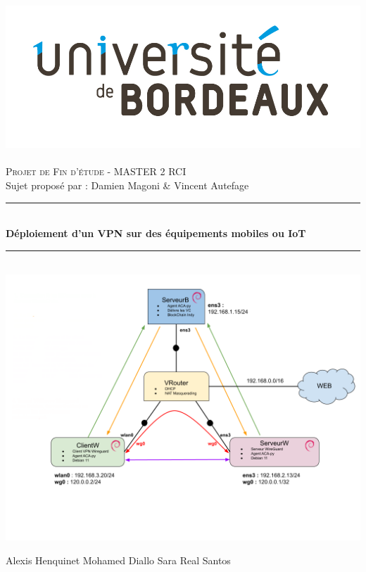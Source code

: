 \documentclass[12pt, openany]{report}
\begin{document}
\begin{titlepage}
  \begin{sffamily}
  \begin{center}
	\includegraphics[scale=0.2]{universite.jpg}~\\[1cm]

    \textsc{\Large Projet de Fin d'étude - MASTER 2 RCI }\\[1.5cm]
    Sujet proposé par : Damien Magoni \& Vincent Autefage

    \rule{1\linewidth}{2pt}
     \\[1cm]
    { \huge \bfseries Déploiement d'un VPN sur des équipements mobiles ou IoT\\[1cm] }
    \rule{1\linewidth}{2pt}
    \\[1cm]
    \includegraphics[scale=0.43]{topo.png}

   \vfill
      \begin{center}
        \Large	 Alexis Henquinet \hspace*{1cm} Mohamed Diallo \hspace*{1cm} Sara Real Santos
      \end{center}
 
 
  \end{center}
  \end{sffamily}
\end{titlepage}
\end{document}
